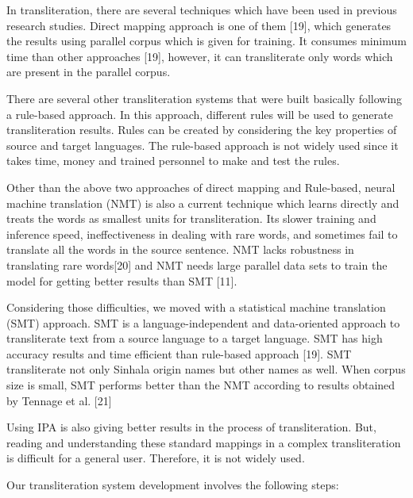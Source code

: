 \documentclass[10pt, a4paper, conference, compsocconf]{IEEEtran}
\begin{document}
In transliteration, there are several techniques which have been used in previous research studies. Direct mapping approach is one of them [19], which generates the results using parallel corpus which is given for training. It consumes minimum time than other approaches [19], however,  it can transliterate only words which are present in the parallel corpus. 

There are several other transliteration systems that were built basically following a rule-based approach. In this approach, different rules will be used to generate transliteration results. Rules can be created by considering the key properties of source and target languages. The rule-based approach is not widely used since it takes time, money and trained personnel to make and test the rules.

Other than the above two approaches of direct mapping and Rule-based, neural machine translation (NMT) is also a current technique which learns directly and treats the words as smallest units for transliteration. Its slower training and inference speed, ineffectiveness in dealing with rare words, and sometimes fail to translate all the words in the source sentence. NMT lacks robustness in translating rare words[20] and  NMT needs large parallel data sets to train the model for getting better results than SMT [11].

Considering those difficulties, we moved with a statistical machine translation (SMT) approach. SMT is a language-independent and data-oriented approach to transliterate text from a source language to a target language. SMT has high accuracy results and time efficient than rule-based approach [19]. SMT transliterate not only Sinhala origin names but other names as well. When corpus size is small, SMT performs better than the NMT according to results obtained by Tennage et al. [21]

Using IPA is also giving better results in the process of transliteration. But, reading and understanding these standard mappings in a complex transliteration is difficult for a general user. Therefore, it is not widely used.

Our transliteration system development involves the following steps:
\end{document}
